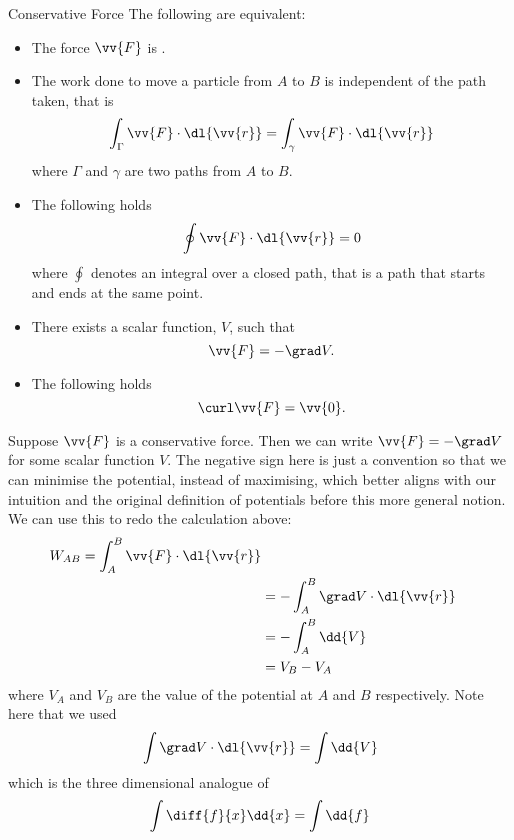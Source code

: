 \documentclass[fleqn]{NotesClass}
\begin{document}
    \begin{dfn}{Conservative Force}{}
        The following are equivalent:
        \begin{itemize}
            \item The force \(\vv{F}\) is .
            \item The work done to move a particle from \(A\) to \(B\) is independent of the path taken, that is
            \begin{equation}
                \int_\Gamma \vv{F}\cdot\dl{\vv{r}} = \int_\gamma \vv{F}\cdot\dl{\vv{r}}
            \end{equation}
            where \(\Gamma\) and \(\gamma\) are two paths from \(A\) to \(B\).
            \item The following holds
            \begin{equation}
                \oint \vv{F}\cdot\dl{\vv{r}} = 0
            \end{equation}
            where \(\oint\) denotes an integral over a closed path, that is a path that starts and ends at the same point.
            \item There exists a scalar function, \(V\), such that
            \begin{equation}
                \vv{F} = -\grad V.
            \end{equation}
            \item The following holds
            \begin{equation}
                \curl\vv{F} = \vv{0}.
            \end{equation}
        \end{itemize}
    \end{dfn}
    
    Suppose \(\vv{F}\) is a conservative force.
    Then we can write \(\vv{F} = -\grad V\) for some scalar function \(V\). The negative sign here is just a convention so that we can minimise the potential, instead of maximising, which better aligns with our intuition and the original definition of potentials before this more general notion.
    We can use this to redo the calculation above:
    \begin{align}
        W_{AB} = \int_{A}^{B}\vv{F}\cdot\dl{\vv{r}}\\
        &= -\int_A^B \grad V \cdot\dl{\vv{r}}\\
        &= -\int_A^B\dd{V}\\
        &= V_B - V_A\label{eqn:W=Vb-Va}
    \end{align}
    where \(V_A\) and \(V_B\) are the value of the potential at \(A\) and \(B\) respectively.
    Note here that we used
    \begin{equation}
        \int\grad V\cdot\dl{\vv{r}} = \int\dd{V}
    \end{equation}
    which is the three dimensional analogue of
    \begin{equation}
        \int \diff{f}{x}\dd{x} = \int\dd{f}
    \end{equation}
    
\end{document}
